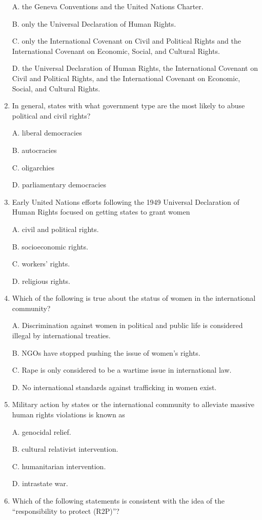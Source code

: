 \documentclass[
]{book}
\begin{document}
\begin{enumerate}
  A. the Geneva Conventions and the United Nations Charter.

  B. only the Universal Declaration of Human Rights.

  C. only the International Covenant on Civil and Political Rights and the International Covenant on Economic, Social, and Cultural Rights.

  D. the Universal Declaration of Human Rights, the International Covenant on Civil and Political Rights, and the International Covenant on Economic, Social, and Cultural Rights.
\item
  In general, states with what government type are the most likely to abuse political and civil rights?

  A. liberal democracies

  B. autocracies

  C. oligarchies

  D. parliamentary democracies
\item
  Early United Nations efforts following the 1949 Universal Declaration of Human Rights focused on getting states to grant women

  A. civil and political rights.

  B. socioeconomic rights.

  C. workers' rights.

  D. religious rights.
\item
  Which of the following is true about the status of women in the international community?

  A. Discrimination against women in political and public life is considered illegal by international treaties.

  B. NGOs have stopped pushing the issue of women's rights.

  C. Rape is only considered to be a wartime issue in international law.

  D. No international standards against trafficking in women exist.
\item
  Military action by states or the international community to alleviate massive human rights violations is known as

  A. genocidal relief.

  B. cultural relativist intervention.

  C. humanitarian intervention.

  D. intrastate war.
\item
  Which of the following statements is consistent with the idea of the ``responsibility to protect (R2P)''?


\end{enumerate}
\end{document}
